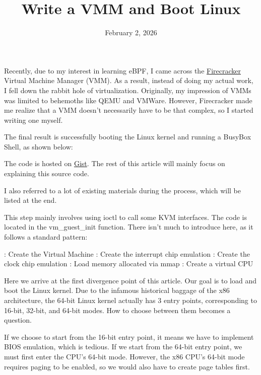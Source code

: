 
\title {Write a VMM and Boot Linux}
\date {February 2, 2026}

Recently, due to my interest in learning  eBPF, I came across the  \href{https://firecracker-microvm.github.io/}{Firecracker} Virtual Machine Manager (VMM). As a result, instead of doing my actual work, I fell down the rabbit hole of virtualization. Originally, my impression of VMMs was limited to behemoths like  QEMU and VMWare. However,  Firecracker made me realize that a VMM doesn't necessarily have to be that complex, so I started writing one myself.

The final result is successfully booting the Linux kernel and running a  BusyBox Shell, as shown below:


The code is hosted on  \href{https://gist.github.com/mistivia/701ce77756b3dd5e39581be9c5a2c30b}{Gist}. The rest of this article will mainly focus on explaining this source code.

I also referred to a lot of existing materials during the process, which will be listed at the end.


This step mainly involves using  {\itt ioctl} to call some  KVM interfaces. The code is located in the  {\itt vm\_guest\_init} function. There isn't much to introduce here, as it follows a standard pattern:

\bli
    : Create the Virtual Machine
    : Create the interrupt chip emulation
    : Create the clock chip emulation
    : Load memory allocated via  mmap
    : Create a virtual  CPU
\eli


Here we arrive at the first divergence point of this article. Our goal is to load and boot the  Linux kernel. Due to the infamous historical baggage of the  x86 architecture, the 64-bit  Linux kernel actually has 3 entry points, corresponding to  16-bit, 32-bit, and  64-bit modes. How to choose between them becomes a question.

If we choose to start from the  16-bit entry point, it means we have to implement  BIOS emulation, which is tedious. If we start from the  64-bit entry point, we must first enter the  CPU's 64-bit mode. However, the  x86 CPU's 64-bit mode requires paging to be enabled, so we would also have to  create page tables first.

